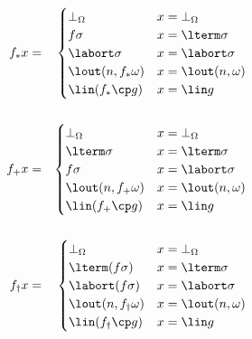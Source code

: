 \begin{multicols}{2}
        \begin{eqnarray*}
          f_{\ast} x &=& \begin{cases}
                          \bot_{\Omega} & x = \bot_{\Omega} \\
                          f \sigma & x = \lterm \sigma \\
                          \labort \sigma & x = \labort \sigma \\
                          \lout(n, f_{\ast} \omega) & x = \lout(n, \omega) \\ 
                          \lin(f_{\ast} \cp g) & x = \lin g 
                        \end{cases} \\ \\
            f_{+} x &=& \begin{cases}
                          \bot_{\Omega} & x = \bot_{\Omega} \\
                          \lterm \sigma & x = \lterm \sigma \\
                          f \sigma & x = \labort \sigma \\
                          \lout(n, f_{+} \omega) & x = \lout(n, \omega) \\ 
                          \lin(f_{+} \cp g) & x = \lin g 
                        \end{cases} \\ \\
                        f_{\dag} x &=& \begin{cases}
                          \bot_{\Omega} & x = \bot_{\Omega} \\
                          \lterm(f \sigma) & x = \lterm \sigma \\
                          \labort(f \sigma) & x = \labort \sigma \\
                          \lout(n, f_{\dag} \omega) & x = \lout(n, \omega) \\
                          \lin(f_{\dag} \cp g) & x = \lin g 
                        \end{cases}
        \end{eqnarray*}
      \end{multicols}

